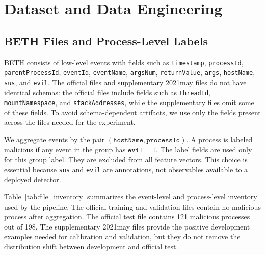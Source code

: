 \documentclass[10pt,journal,compsoc]{IEEEtran}
\begin{document}
\section{Dataset and Data Engineering}
\label{sec:data}

\subsection{BETH Files and Process-Level Labels}

BETH consists of low-level events with fields such as \texttt{timestamp}, \texttt{processId}, \texttt{parentProcessId}, \texttt{eventId}, \texttt{eventName}, \texttt{argsNum}, \texttt{returnValue}, \texttt{args}, \texttt{hostName}, \texttt{sus}, and \texttt{evil}. The official files and supplementary 2021may files do not have identical schemas: the official files include fields such as \texttt{threadId}, \texttt{mountNamespace}, and \texttt{stackAddresses}, while the supplementary files omit some of these fields. To avoid schema-dependent artifacts, we use only the fields present across the files needed for the experiment.

We aggregate events by the pair $(\texttt{hostName}, \texttt{processId})$. A process is labeled malicious if any event in the group has $\texttt{evil}=1$. The label fields are used only for this group label. They are excluded from all feature vectors. This choice is essential because \texttt{sus} and \texttt{evil} are annotations, not observables available to a deployed detector.

Table~\ref{tab:file_inventory} summarizes the event-level and process-level inventory used by the pipeline. The official training and validation files contain no malicious process after aggregation. The official test file contains 121 malicious processes out of 198. The supplementary 2021may files provide the positive development examples needed for calibration and validation, but they do not remove the distribution shift between development and official test.
\end{document}
